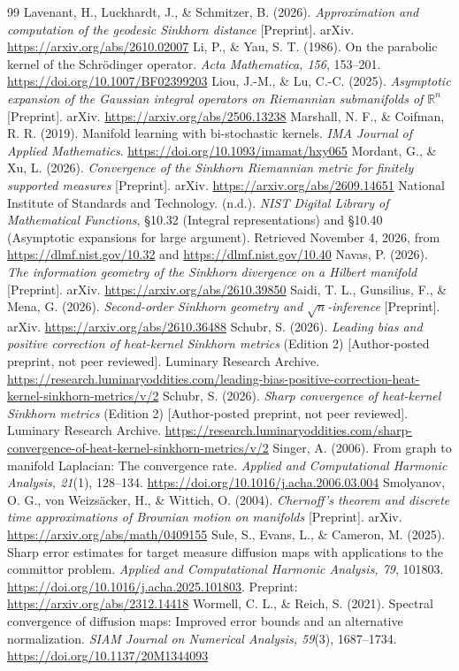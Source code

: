 \documentclass[11pt,a4paper]{article}
\theoremstyle{definition}\newtheorem{definition}[theorem]{Definition}
\theoremstyle{remark}\newtheorem{remark}[theorem]{Remark}
\newcommand{\R}{\mathbb R}
\begin{document}
\begin{thebibliography}{99}
 Lavenant, H., Luckhardt, J., \& Schmitzer, B. (2026). \emph{Approximation and computation of the geodesic Sinkhorn distance} [Preprint]. arXiv. \url{https://arxiv.org/abs/2610.02007}
 Li, P., \& Yau, S. T. (1986). On the parabolic kernel of the Schr\"odinger operator. \emph{Acta Mathematica, 156}, 153--201. \url{https://doi.org/10.1007/BF02399203}
 Liou, J.-M., \& Lu, C.-C. (2025). \emph{Asymptotic expansion of the Gaussian integral operators on Riemannian submanifolds of $\R^n$} [Preprint]. arXiv. \url{https://arxiv.org/abs/2506.13238}
 Marshall, N. F., \& Coifman, R. R. (2019). Manifold learning with bi-stochastic kernels. \emph{IMA Journal of Applied Mathematics}. \url{https://doi.org/10.1093/imamat/hxy065}
 Mordant, G., \& Xu, L. (2026). \emph{Convergence of the Sinkhorn Riemannian metric for finitely supported measures} [Preprint]. arXiv. \url{https://arxiv.org/abs/2609.14651}
 National Institute of Standards and Technology. (n.d.). \emph{NIST Digital Library of Mathematical Functions}, \S10.32 (Integral representations) and \S10.40 (Asymptotic expansions for large argument). Retrieved November 4, 2026, from \url{https://dlmf.nist.gov/10.32} and \url{https://dlmf.nist.gov/10.40}
 Navas, P. (2026). \emph{The information geometry of the Sinkhorn divergence on a Hilbert manifold} [Preprint]. arXiv. \url{https://arxiv.org/abs/2610.39850}
 Saidi, T. L., Gunsilius, F., \& Mena, G. (2026). \emph{Second-order Sinkhorn geometry and $\sqrt n$-inference} [Preprint]. arXiv. \url{https://arxiv.org/abs/2610.36488}
 Schubr, S. (2026). \emph{Leading bias and positive correction of heat-kernel Sinkhorn metrics} (Edition 2) [Author-posted preprint, not peer reviewed]. Luminary Research Archive. \url{https://research.luminaryoddities.com/leading-bias-positive-correction-heat-kernel-sinkhorn-metrics/v/2}
 Schubr, S. (2026). \emph{Sharp convergence of heat-kernel Sinkhorn metrics} (Edition 2) [Author-posted preprint, not peer reviewed]. Luminary Research Archive. \url{https://research.luminaryoddities.com/sharp-convergence-of-heat-kernel-sinkhorn-metrics/v/2}
 Singer, A. (2006). From graph to manifold Laplacian: The convergence rate. \emph{Applied and Computational Harmonic Analysis, 21}(1), 128--134. \url{https://doi.org/10.1016/j.acha.2006.03.004}
 Smolyanov, O. G., von Weizs\"acker, H., \& Wittich, O. (2004). \emph{Chernoff's theorem and discrete time approximations of Brownian motion on manifolds} [Preprint]. arXiv. \url{https://arxiv.org/abs/math/0409155}
 Sule, S., Evans, L., \& Cameron, M. (2025). Sharp error estimates for target measure diffusion maps with applications to the committor problem. \emph{Applied and Computational Harmonic Analysis, 79}, 101803. \url{https://doi.org/10.1016/j.acha.2025.101803}. Preprint: \url{https://arxiv.org/abs/2312.14418}
 Wormell, C. L., \& Reich, S. (2021). Spectral convergence of diffusion maps: Improved error bounds and an alternative normalization. \emph{SIAM Journal on Numerical Analysis, 59}(3), 1687--1734. \url{https://doi.org/10.1137/20M1344093}
\end{thebibliography}
\end{document}
